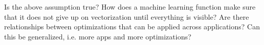 Is the above assumption true? How does a machine learning function make sure that it does 
not give up on vectorization until everything is visible? 
Are there relationships between optimizations that can be applied across applications?
Can this be generalized, i.e. more apps and more optimizations?

